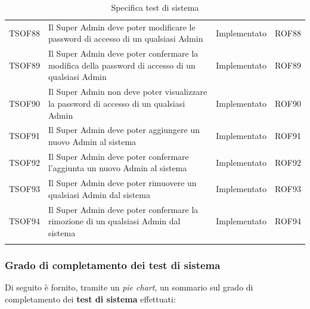 \documentclass[../PianoDiQualifica_v4.0.0.tex]{subfiles}
\begin{document}
\begin{longtable}[c] { >{\centering\arraybackslash}p{2cm} p{7cm} >{\centering\arraybackslash}p{4cm} >{\centering\arraybackslash}p{2cm}}
			\addlinespace[0.3em]
			\midrule
			\addlinespace[0.3em]
			TSOF88 & Il Super Admin deve poter modificare le password di accesso di un qualsiasi Admin & Implementato & ROF88 \\
			\addlinespace[0.3em]
			\midrule
			\addlinespace[0.3em]
			TSOF89 & Il Super Admin deve poter confermare la modifica della password di accesso di un qualsiasi Admin & Implementato & ROF89 \\
			\addlinespace[0.3em]
			\midrule
			\addlinespace[0.3em]
			TSOF90 & Il Super Admin non deve poter visualizzare la password di accesso di un qualsiasi Admin & Implementato & ROF90 \\
			\addlinespace[0.3em]
			\midrule
			\addlinespace[0.3em]
			TSOF91 & Il Super Admin deve poter aggiungere un nuovo Admin al sistema	 & Implementato & ROF91 \\
			\addlinespace[0.3em]
			\midrule
			\addlinespace[0.3em]
			TSOF92 & Il Super Admin deve poter confermare l'aggiunta un nuovo Admin al sistema & Implementato & ROF92 \\
			\addlinespace[0.3em]
			\midrule
			\addlinespace[0.3em]
			TSOF93 & Il Super Admin deve poter rimuovere un qualsiasi Admin dal sistema	 & Implementato & ROF93 \\
			\addlinespace[0.3em]
			\midrule
			\addlinespace[0.3em]
			TSOF94 & Il Super Admin deve poter confermare la rimozione di un qualsiasi Admin dal sistema & Implementato & ROF94 \\
		\bottomrule
		\caption{Specifica test di sistema}
	\end{longtable}

	\newpage
		\subsubsection{Grado di completamento dei test di sistema}

		Di seguito è fornito, tramite un \textit{pie chart}, un sommario sul grado di completamento dei \textbf{test di sistema} effettuati:
\end{document}
